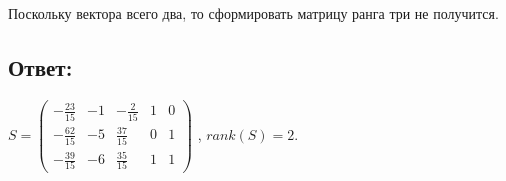 \documentclass[12pt]{article}
\begin{document}
    Поскольку вектора всего два, то сформировать матрицу ранга три не получится.

    \subsection*{Ответ:}
    $
    S =
    \begin{pmatrix}
        -\frac{23}{15} & -1 & -\frac{2}{15} & 1 & 0 \\
        -\frac{62}{15} & -5 & \frac{37}{15} & 0 & 1 \\
        -\frac{39}{15} & -6 & \frac{35}{15} & 1 & 1
    \end{pmatrix}
    $
    ,
    $rank(S) = 2$.
\end{document}
